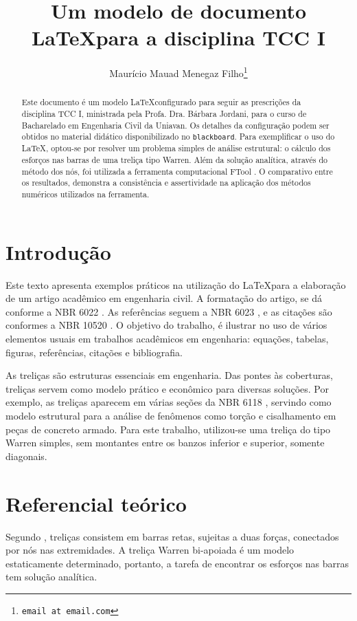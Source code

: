 \documentclass[a4paper, 12pt]{article} %
\title{Um modelo de documento \LaTeX\space para a disciplina TCC I}
\author{Maurício Mauad Menegaz Filho\footnote{\texttt{email at email.com}}}
\begin{document}
\maketitle %
\begin{abstract}Este documento é um modelo \LaTeX \space configurado para seguir as prescrições da disciplina TCC I, ministrada pela Profa. Dra. Bárbara Jordani, para o curso de Bacharelado em Engenharia Civil da Uniavan. Os detalhes da configuração podem ser obtidos no material didático disponibilizado no {\tt blackboard}. Para exemplificar o uso do \LaTeX, optou-se por resolver um problema simples de análise estrutural: o cálculo dos esforços nas barras de uma treliça tipo Warren. Além da solução analítica, através do método dos nós, foi utilizada a ferramenta computacional FTool \cite{ftool}. O comparativo entre os resultados, demonstra a consistência e assertividade na aplicação dos métodos numéricos utilizados na ferramenta.
\end{abstract}

\section{Introdução}

Este texto apresenta exemplos práticos na utilização do \LaTeX\space para a elaboração de um artigo acadêmico em engenharia civil. A formatação do artigo, se dá conforme a NBR 6022 \cite{nbr6022}. As referências seguem a NBR 6023 \cite{nbr6023}, e as citações são conformes a NBR 10520 \cite{nbr10520}. 
O objetivo do trabalho, é ilustrar no uso de vários elementos usuais em trabalhos acadêmicos em engenharia: equações, tabelas, figuras, referências, citações e bibliografia.

As treliças são estruturas essenciais em engenharia. Das pontes às coberturas, treliças servem como modelo prático e econômico para diversas soluções. Por exemplo, as treliças aparecem em várias seções da NBR 6118 \cite{nbr6118}, servindo como modelo estrutural para a análise de fenômenos como torção e cisalhamento em peças de concreto armado. Para este trabalho, utilizou-se uma treliça do tipo Warren simples, sem montantes entre os banzos inferior e superior, somente diagonais. 

\section{Referencial teórico}
Segundo \cite{beerjohnston}, treliças consistem em barras retas, sujeitas a duas forças, conectados por nós nas extremidades. A treliça Warren bi-apoiada é um modelo estaticamente determinado, portanto, a tarefa de encontrar os esforços nas barras tem solução analítica. 
\end{document}
